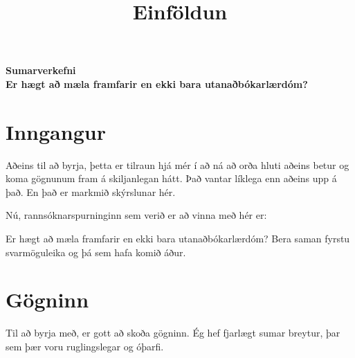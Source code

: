 \documentclass[
]{article}
\title{Einföldun}
\author{}
\date{\vspace{-2.5em}}
\newenvironment{Shaded}{\begin{snugshade}}{\end{snugshade}}
\newcommand{\DataTypeTok}[1]{\textcolor[rgb]{0.13,0.29,0.53}{#1}}
\newcommand{\KeywordTok}[1]{\textcolor[rgb]{0.13,0.29,0.53}{\textbf{#1}}}
\newcommand{\NormalTok}[1]{#1}
\newcommand{\OperatorTok}[1]{\textcolor[rgb]{0.81,0.36,0.00}{\textbf{#1}}}
\newcommand{\StringTok}[1]{\textcolor[rgb]{0.31,0.60,0.02}{#1}}
\begin{document}
\maketitle

\begin{center}
\LARGE{\textbf{Sumarverkefni}}\\
\vspace*{2\baselineskip}
\Large{\textbf{Er hægt að mæla framfarir en ekki bara utanaðbókarlærdóm?}}
\end{center}
\thispagestyle{empty}
\newpage

\hypertarget{inngangur}{%
\section{Inngangur}\label{inngangur}}

Aðeins til að byrja, þetta er tilraun hjá mér í að ná að orða hluti aðeins betur og koma gögnunum fram á skiljanlegan hátt. Það vantar líklega enn aðeins upp á það. En það er markmið skýrslunar hér.

Nú, rannsóknarspurninginn sem verið er að vinna með hér er:

Er hægt að mæla framfarir en ekki bara utanaðbókarlærdóm? Bera saman fyrstu svarmöguleika og þá sem hafa komið áður.

\hypertarget{guxf6gninn}{%
\section{Gögninn}\label{guxf6gninn}}

Til að byrja með, er gott að skoða gögninn. Ég hef fjarlægt sumar breytur, þar sem þær voru ruglingslegar og óþarfi.

\begin{Shaded}
\end{Shaded}
\end{document}
